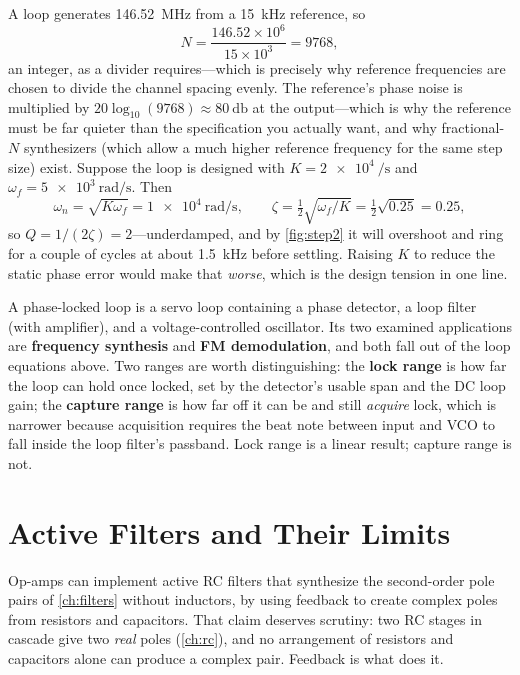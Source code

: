 \begin{workedbox}
A loop generates \SI{146.52}{\mega\hertz} from a \SI{15}{\kilo\hertz} reference, so
\[
N=\frac{146.52\times10^{6}}{15\times10^{3}}=9768 ,
\]
an integer, as a divider requires---which is precisely why reference frequencies are
chosen to divide the channel spacing evenly. The reference's phase noise is multiplied
by \(20\log_{10}(9768)\approx\SI{80}{\decibel}\) at the output---which is why the
reference must be far quieter than the specification you actually want, and why
fractional-\(N\) synthesizers (which allow a much higher reference frequency for the
same step size) exist. Suppose the loop is designed with \(K=\SI{2e4}{\per\second}\)
and \(\omega_f=\SI{5e3}{\radian\per\second}\). Then
\[
\omega_n=\sqrt{K\omega_f}=\SI{1e4}{\radian\per\second},
\qquad
\zeta=\tfrac12\sqrt{\omega_f/K}=\tfrac12\sqrt{0.25}=0.25,
\]
so \(Q=1/(2\zeta)=2\)---underdamped, and by \cref{fig:step2} it will overshoot and
ring for a couple of cycles at about \SI{1.5}{\kilo\hertz} before settling. Raising
\(K\) to reduce the static phase error would make that \emph{worse}, which is the
design tension in one line.
\end{workedbox}

\begin{exambox}
A phase-locked loop is a servo loop containing a phase detector, a loop filter (with
amplifier), and a voltage-controlled oscillator. Its two examined applications are
\textbf{frequency synthesis} and \textbf{FM demodulation}, and both fall out of the
loop equations above. Two ranges are worth distinguishing: the \textbf{lock range} is
how far the loop can hold once locked, set by the detector's usable span and the DC
loop gain; the \textbf{capture range} is how far off it can be and still \emph{acquire}
lock, which is narrower because acquisition requires the beat note between input and
VCO to fall inside the loop filter's passband. Lock range is a linear result; capture
range is not.
\end{exambox}

\section{Active Filters and Their Limits}
Op-amps can implement active RC filters that synthesize the second-order pole
pairs of \cref{ch:filters} without inductors, by using feedback to create complex
poles from resistors and capacitors. That claim deserves scrutiny: two RC stages in
cascade give two \emph{real} poles (\cref{ch:rc}), and no arrangement of resistors and
capacitors alone can produce a complex pair. Feedback is what does it.

